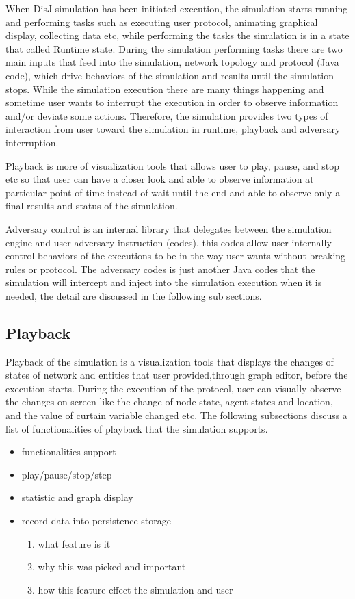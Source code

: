 When DisJ simulation has been initiated execution, the simulation starts running and performing tasks such as executing user protocol, animating graphical display, collecting data etc, while performing the tasks the simulation is in a state that called Runtime state. During the simulation performing tasks there are two main inputs that feed into the simulation, network topology and protocol (Java code), which drive behaviors of the simulation and results until the simulation stops. While the simulation execution there are many things happening and sometime user wants to interrupt the execution in order to observe information and/or deviate some actions. Therefore, the simulation provides two types of interaction from user toward the simulation in runtime, playback and adversary interruption.

Playback is more of visualization tools that allows user to play, pause, and stop etc so that user can have a closer look and able to observe information at particular point of time instead of wait until the end and able to observe only a final results and status of the simulation.

Adversary control is an internal library that delegates between the simulation engine and user adversary instruction (codes), this codes allow user internally control behaviors of the executions to be in the way user wants without breaking rules or protocol. The adversary codes is just another Java codes that the simulation will intercept and inject into the simulation execution when it is needed, the detail are discussed in the following sub sections.


\subsection{Playback}

Playback of the simulation is a visualization tools that displays the changes of states of network and entities that user provided,through graph editor, before the execution starts. During the execution of the protocol, user can visually observe the changes on screen like the change of node state, agent states and location, and the value of curtain variable changed etc. The following subsections discuss a list of functionalities of playback that the simulation supports.

\begin{itemize}
\item functionalities support
\item play/pause/stop/step
\item statistic and graph display
\item record data into persistence storage
    \begin{enumerate}
    \item what feature is it
    \item why this was picked and important
    \item how this feature effect the simulation and user
    \end{enumerate}
\end{itemize}

